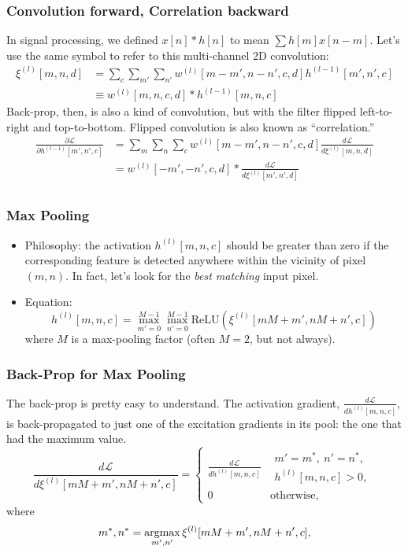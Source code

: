 \documentclass{beamer}
\newcommand{\argmax}{\operatornamewithlimits{argmax}}
\begin{document}
\begin{frame}
  \frametitle{Convolution forward, Correlation backward}

  In signal processing, we defined $x[n]\ast h[n]$ to mean $\sum
  h[m]x[n-m]$.  Let's use the same symbol to refer to this
  multi-channel 2D convolution:
  \begin{align*}
    \xi^{(l)}[m,n,d] &= \sum_c\sum_{m'}\sum_{n'} w^{(l)}[m-m',n-n',c,d]h^{(l-1)}[m',n',c]\\
    &\equiv w^{(l)}[m,n,c,d] \ast h^{(l-1)}[m,n,c]
  \end{align*}
  Back-prop, then, is also a kind of convolution, but with the filter
  flipped left-to-right and top-to-bottom.  Flipped convolution is also
  known as ``correlation.''
  \begin{align*}
    \frac{\partial{\mathcal L}}{\partial h^{(l-1)}[m',n',c]} &=
    \sum_{m}\sum_{n}\sum_c w^{(l)}[m-m',n-n',c,d]\frac{d{\mathcal L}}{d\xi^{(l)}[m,n,d]}\\
    &= w^{(l)}[-m',-n',c,d] \ast \frac{d{\mathcal L}}{d\xi^{(l)}[m',n',d]}\\
  \end{align*}
\end{frame}

\begin{frame}
  \frametitle{Max Pooling}
  \begin{itemize}
  \item Philosophy: the activation $h^{(l)}[m,n,c]$ should be greater
    than zero if the corresponding feature is detected anywhere within
    the vicinity of pixel $(m,n)$.  In fact, let's look for the {\em
      best matching} input pixel.
  \item Equation:
    \begin{displaymath}
      h^{(l)}[m,n,c] = \max_{m'=0}^{M-1}\max_{n'=0}^{M-1} \mbox{ReLU}\left(\xi^{(l)}[mM+m',nM+n',c]\right)
    \end{displaymath}
    where $M$ is a max-pooling factor (often $M=2$, but not always).
  \end{itemize}
\end{frame}

\begin{frame}
  \frametitle{Back-Prop for Max Pooling}

  The back-prop is pretty easy to understand.  The activation gradient,
  $\frac{d{\mathcal L}}{dh^{(l)}[m,n,c]}$, is back-propagated to just one of
  the excitation gradients in its pool: the one that had the maximum value.
  \[
  \frac{d{\mathcal L}}{d\xi^{(l)}[mM+m',nM+n',c]}=
  \begin{cases}
    \frac{d{\mathcal L}}{dh^{(l)}[m,n,c]} & \begin{array}{l}m'=m^*,~n'=n^*,\\h^{(l)}[m,n,c]>0,\end{array}\\
    0 & \mbox{otherwise},
  \end{cases}
  \]
  where
  \[
  m^*,n^* =\argmax_{m',n'} \xi^{(l)}[mM+m',nM+n',c],
  \]
\end{frame}
\end{document}
